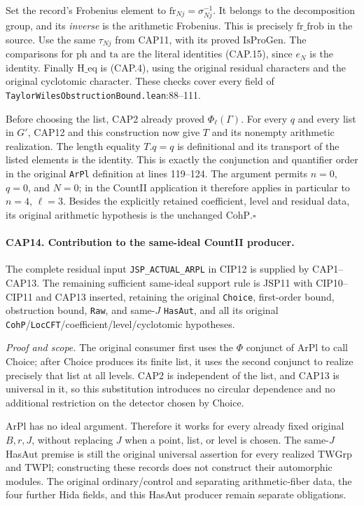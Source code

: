 Set the record's Frobenius element to
$\mathrm{fr}_{Nj}=\sigma_{Nj}^{-1}$.  It belongs to the decomposition
group, and its \emph{inverse} is the arithmetic Frobenius.
This is precisely $\mathrm{fr\_frob}$ in the source.  Use the same
$\tau_{Nj}$ from CAP11, with its proved $\mathrm{IsProGen}$.
The comparisons for $\mathrm{ph}$ and $\mathrm{ta}$ are the
literal identities (CAP.15), since $e_N$ is the identity.
Finally $\mathrm{H\_eq}$ is (CAP.4), using the original residual
characters and the original cyclotomic character.  These checks cover
every field of \nolinkurl{TaylorWilesObstructionBound.lean}:88--111.

Before choosing the list, CAP2 already proved $\Phi_\ell(\Gamma)$.
For every $q$ and every list in $G'$, CAP12 and this construction now
give $T$ and its nonempty arithmetic realization.  The length equality
$T.q=q$ is definitional and its transport of the listed elements is
the identity.  This is exactly the conjunction and quantifier order
in the original \texttt{ArPl} definition at lines 119--124.
The argument permits $n=0$, $q=0$, and $N=0$; in the CountII
application it therefore applies in particular to $n=4$, $\ell=3$.
Besides the explicitly retained coefficient, level and residual data,
its original arithmetic hypothesis is the unchanged
$\mathrm{CohP}$.\hfill$\square$

\paragraph{CAP14. Contribution to the same-ideal CountII producer.}
\label{claim:CAP14}
The complete residual input \texttt{JSP\_ACTUAL\_ARPL} in CIP12 is
supplied by CAP1--CAP13.  The remaining sufficient same-ideal support
rule is JSP11 with CIP10--CIP11 and CAP13 inserted, retaining the
original \texttt{Choice}, first-order bound, obstruction bound,
\texttt{Raw}, and same-$J$ \texttt{HasAut}, and all its original
\texttt{CohP}/\texttt{LocCFT}/coefficient/level/cyclotomic hypotheses.

\emph{Proof and scope.}
The original consumer first uses the $\Phi$ conjunct of $\mathrm{ArPl}$
to call $\mathrm{Choice}$; after Choice produces its finite list, it
uses the second conjunct to realize precisely that list at all levels.
CAP2 is independent of the list, and CAP13 is universal in it, so
this substitution introduces no circular dependence and no additional
restriction on the detector chosen by Choice.

ArPl has no ideal argument.  Therefore it works for every already
fixed original $B,r,J$, without replacing $J$ when a point, list, or
level is chosen.  The same-$J$ HasAut premise is still the original
universal assertion for every realized $\mathrm{TWGrp}$ and
$\mathrm{TWPl}$; constructing these records does not construct their
automorphic modules.  The original ordinary/control and separating
arithmetic-fiber data, the four further Hida fields, and this HasAut
producer remain separate obligations.

